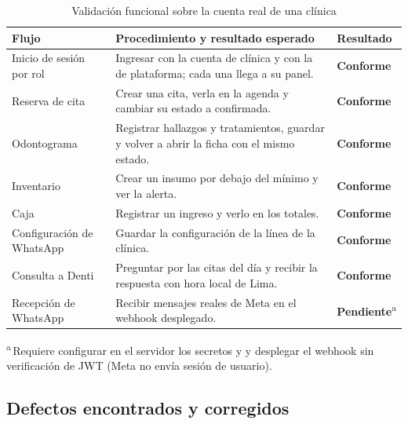 \documentclass[11pt]{article}
\begin{document}
\begin{table}[H]
\centering\small
\caption{Validación funcional sobre la cuenta real de una clínica}\label{tab:validacion}
\begin{tabularx}{\linewidth}{@{}P{3.4cm}LP{1.9cm}@{}}
\toprule
\textbf{Flujo} & \textbf{Procedimiento y resultado esperado} & \textbf{Resultado} \\
\midrule
Inicio de sesión por rol & Ingresar con la cuenta de clínica y con la de plataforma; cada una llega a su panel. & \textcolor{sdteal}{\textbf{Conforme}} \\
Reserva de cita & Crear una cita, verla en la agenda y cambiar su estado a confirmada. & \textcolor{sdteal}{\textbf{Conforme}} \\
Odontograma & Registrar hallazgos y tratamientos, guardar y volver a abrir la ficha con el mismo estado. & \textcolor{sdteal}{\textbf{Conforme}} \\
Inventario & Crear un insumo por debajo del mínimo y ver la alerta. & \textcolor{sdteal}{\textbf{Conforme}} \\
Caja & Registrar un ingreso y verlo en los totales. & \textcolor{sdteal}{\textbf{Conforme}} \\
Configuración de WhatsApp & Guardar la configuración de la línea de la clínica. & \textcolor{sdteal}{\textbf{Conforme}} \\
Consulta a Denti & Preguntar por las citas del día y recibir la respuesta con hora local de Lima. & \textcolor{sdteal}{\textbf{Conforme}} \\
Recepción de WhatsApp & Recibir mensajes reales de Meta en el webhook desplegado. & \textcolor{sdamber}{\textbf{Pendiente}}\textsuperscript{a} \\
\bottomrule
\end{tabularx}
\par\smallskip\raggedright\footnotesize\textsuperscript{a}\,Requiere configurar en el servidor los secretos  y  y desplegar el webhook sin verificación de JWT (Meta no envía sesión de usuario).
\end{table}

\subsection{Defectos encontrados y corregidos}\label{sec:defectos}
\end{document}
